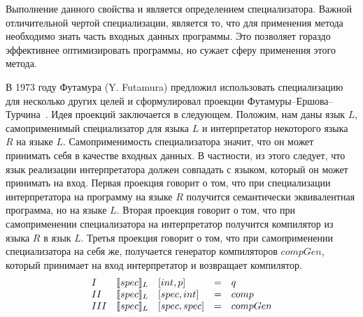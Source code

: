 Выполнение данного свойства и является определением специализатора. Важной отличительной чертой специализации, является то, что для применения метода необходимо знать часть входных данных программы. Это позволяет гораздо эффективнее оптимизировать программы, но сужает сферу применения этого метода.

В 1973 году Футамура (Y. Futamura) предложил использовать специализацию для несколько других целей и сформулировал проекции Футамуры--Ершова--Турчина~\cite{Futa}. Идея проекций заключается в следующем. Положим, нам даны язык $L$, самоприменимый специализатор для языка $L$ и интерпретатор некоторого языка $R$ на языке $L$. Самоприменимость специализатора значит, что он может принимать себя в качестве входных данных. В частности, из этого следует, что язык реализации интерпретатора должен совпадать с языком, который он может принимать на вход. Первая проекция говорит о том, что при специализации интерпретатора на программу на языке $R$ получится семантически эквивалентная программа, но на языке $L$. Вторая проекция говорит о том, что при самоприменении специализатора на интерпретатор получится компилятор из языка $R$ в язык $L$. Третья проекция говорит о том, что при самоприменении специализатора на себя же, получается генератор компиляторов $compGen$, который принимает на вход интерпретатор и возвращает компилятор.
    $$
    \begin{array}{l l l c l}
      I & \llbracket spec \rrbracket_L &[int, p] &= &q\\
      II & \llbracket spec \rrbracket_L &[spec, int] &= &comp\\
      III & \llbracket spec \rrbracket_L &[spec, spec] &= &compGen
    \end{array}$$  

